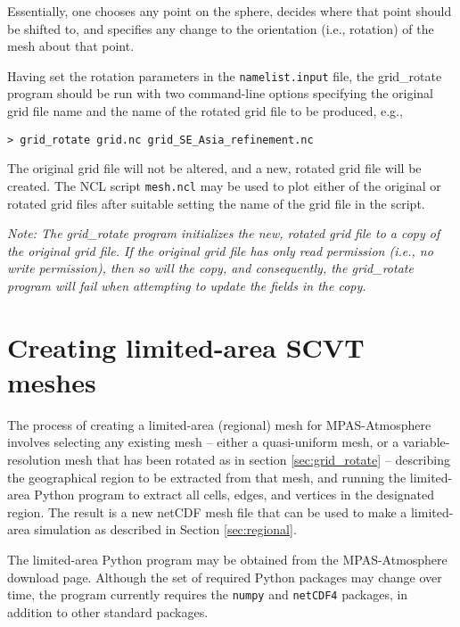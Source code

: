 \noindent Essentially, one chooses any point on the sphere, decides where that
point should be shifted to, and specifies any change to the orientation (i.e.,
rotation) of the mesh about that point. 

Having set the rotation parameters in the {\tt namelist.input} file, the
grid\_rotate program should be run with two command-line options specifying the
original grid file name and the name of the rotated grid file to be produced,
e.g.,

\vspace{12pt}
{\tt > grid\_rotate grid.nc grid\_SE\_Asia\_refinement.nc}
\vspace{12pt}

The original grid file will not be altered, and a new, rotated grid file will be
created. The NCL script {\tt mesh.ncl} may be used to plot either of the
original or rotated grid files after suitable setting the name of the grid file
in the script.

\vspace{12pt}
{\em Note: The grid\_rotate program initializes the new, rotated grid file to a copy of the original grid file.
If the original grid file has only read permission (i.e., no write permission), then so will the copy, and
consequently, the grid\_rotate program will fail when attempting to update the fields in the copy.}


\section{Creating limited-area SCVT meshes}
\label{sec:mesh_subset} 

The process of creating a limited-area (regional) mesh for MPAS-Atmosphere involves
selecting any existing mesh -- either a quasi-uniform mesh, or a variable-resolution mesh
that has been rotated as in section \ref{sec:grid_rotate} -- describing the geographical
region to be extracted from that mesh, and running the limited-area Python program to extract
all cells, edges, and vertices in the designated region. The result is a new netCDF mesh file that can
be used to make a limited-area simulation as described in Section \ref{sec:regional}.

The limited-area Python program may be obtained from the MPAS-Atmosphere download page. Although
the set of required Python packages may change over time, the program currently requires
the {\tt numpy} and {\tt netCDF4} packages, in addition to other standard packages.
